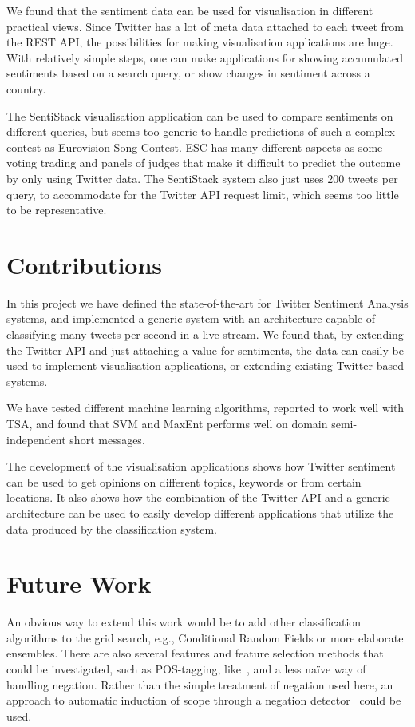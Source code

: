 We found that the sentiment data can be used for visualisation in different practical views. Since Twitter has a lot of meta data attached to each tweet from the REST API, the possibilities for making visualisation applications are huge. With relatively simple steps, one can make applications for showing accumulated sentiments based on a search query, or show changes in sentiment across a country.

The SentiStack visualisation application can be used to compare sentiments on different queries, but seems too generic to handle predictions of such a complex contest as Eurovision Song Contest. ESC has many different aspects as some voting trading and panels of judges that make it difficult to predict the outcome by only using Twitter data. The SentiStack system also just uses 200 tweets per query, to accommodate for the Twitter API request limit, which seems too little to be representative.

\section{Contributions}

In this project we have defined the state-of-the-art for Twitter Sentiment Analysis systems, and implemented a generic system with an architecture capable of classifying many tweets per second in a live stream. We found that, by extending the Twitter API and just attaching a value for sentiments, the data can easily be used to implement visualisation applications, or extending existing Twitter-based systems. 

We have tested different machine learning algorithms, reported to work well with TSA, and found that SVM and MaxEnt performs well on domain semi-independent short messages.

The development of the visualisation applications shows how Twitter sentiment can be used to get opinions on different topics, keywords or from certain locations. It also shows how the combination of the Twitter API and a generic architecture can be used to easily develop different applications that utilize the data produced by the classification system.

\section{Future Work}

An obvious way to extend this work would be to add other classification algorithms to the grid search, e.g., Conditional Random Fields or more elaborate ensembles. There are also several
features and feature selection methods that could be investigated, such as POS-tagging, like~\cite{article:pak}, and a less na\"{i}ve way of handling negation. Rather than the simple treatment of negation used here, an approach to automatic induction of scope through a negation detector~\citep{CouncillEA:10} could be used.

